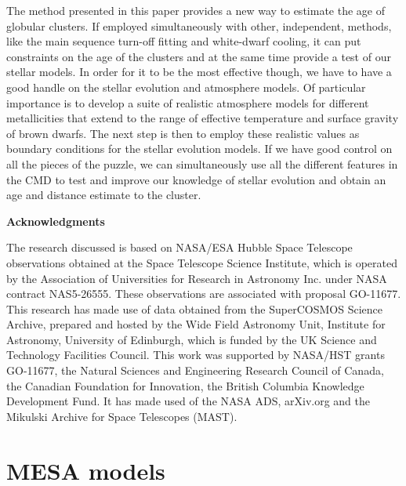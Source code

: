 \documentclass[useAMS,usenatbib]{mnras}
\begin{document}
The method presented in this paper provides a new way to estimate the age of globular clusters. If employed simultaneously with other, independent, methods, like the main sequence turn-off fitting and white-dwarf cooling, it can put constraints on the age of the clusters and at the same time provide a test of our stellar models. In order for it to be the most effective though, we have to have a good handle on the stellar evolution and atmosphere models. Of particular importance is to develop a suite of realistic atmosphere models for different metallicities that extend to the range of effective temperature and surface gravity of brown dwarfs. The next step is then to employ these realistic values as boundary conditions for the stellar evolution models. If we have good control on all the pieces of the puzzle, we can simultaneously use all the different features in the CMD to test and improve our knowledge of stellar evolution and obtain an age and distance estimate to the cluster.

{\noindent \bf Acknowledgments}

The research discussed is based on NASA/ESA Hubble Space Telescope observations obtained at the Space Telescope Science Institute, which is operated by the Association of Universities for Research in Astronomy Inc. under NASA contract NAS5-26555. These observations are associated with proposal GO-11677. This research has made use of data obtained from the SuperCOSMOS Science Archive, prepared and hosted by the Wide Field Astronomy Unit, Institute for Astronomy, University of Edinburgh, which is funded by the UK Science and Technology Facilities Council. This work was supported by NASA/HST grants GO-11677, the Natural Sciences and Engineering Research Council of Canada, the Canadian Foundation for Innovation, the British Columbia Knowledge Development Fund.  It has made used of the NASA ADS, arXiv.org and the Mikulski Archive for Space Telescopes (MAST).





\appendix

\section{MESA models}
\label{sec:mesamodels}
\end{document}

